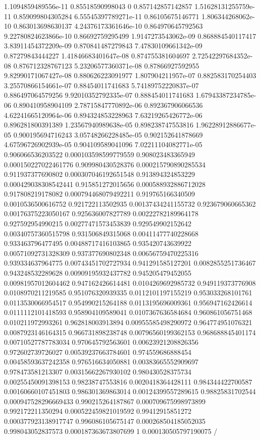 \begin{table}
\begin{tabu}
\begin{sparkline}{10}
1.1094859489556e-11 0.85518590998043 0 0.857142857142857 1.51628131255759e-11 0.859099804305284 6.55545397789271e-11 0.86105675146771 1.806344268062e-10 0.863013698630137 4.24376173361646e-10 0.864970645792563 9.22780824623866e-10 0.86692759295499 1.9147273543062e-09 0.868884540117417 3.83911454372209e-09 0.870841487279843 7.47830109661342e-09 0.87279843444227 1.41846683401647e-08 0.874755381604697 2.72542297684352e-08 0.876712328767123 5.23206577360371e-08 0.87866927592955 9.82990171067427e-08 0.880626223091977 1.807904211957e-07 0.882583170254403 3.25570866154661e-07 0.88454011741683 5.74189752220837e-07 0.886497064579256 9.92010352792335e-07 0.888454011741683 1.67943387234785e-06 0.890410958904109 2.78715847770892e-06 0.892367906066536 4.62241665120964e-06 0.894324853228963 7.63219265426772e-06 0.896281800391389 1.23567940989638e-05 0.898238747553816 1.96228912886677e-05 0.900195694716243 3.05748266228485e-05 0.902152641878669 4.67596726902939e-05 0.904109589041096 7.02211104082771e-05 0.906066536203522 0.000103598599779559 0.908023483365949 0.000150227022461776 0.909980430528376 0.000215790890285534 0.911937377690802 0.000307046192651548 0.913894324853229 0.000429038308542441 0.915851272015656 0.000588932886712028 0.917808219178082 0.000794468079492211 0.919765166340509 0.0010536500616752 0.921722113502935 0.00137434241155732 0.923679060665362 0.00176375223050167 0.925636007827789 0.00222782189964178 0.927592954990215 0.00277471573453839 0.929549902152642 0.00340757360515798 0.931506849315068 0.00411477740228668 0.933463796477495 0.00488717416103865 0.935420743639922 0.00571092731328309 0.937377690802348 0.00656759470225316 0.939334637964775 0.00743451702727934 0.941291585127201 0.0082855251736467 0.943248532289628 0.00909195932437782 0.945205479452055 0.00981957012604462 0.947162426614481 0.0104269692985732 0.949119373776908 0.0108970211219585 0.951076320939335 0.0112101197155219 0.953033268101761 0.0113530066954517 0.954990215264188 0.0113195696009361 0.956947162426614 0.0111112101418593 0.958904109589041 0.0107367636584684 0.960861056751468 0.010211972993261 0.962818003913894 0.00955585498290972 0.964774951076321 0.0087923146164315 0.966731898238748 0.00796560199362153 0.968688845401174 0.00710527787783034 0.970645792563601 0.00623921208826356 0.972602739726027 0.00539237663784601 0.974559686888454 0.00458593637242358 0.976516634050881 0.00383665552909697 0.978473581213307 0.00315662267930102 0.980430528375734 0.00255450091398153 0.98238747553816 0.0020418364428111 0.984344422700587 0.00160660107451803 0.986301369863014 0.00124399557289615 0.98825831702544 0.000947528296669433 0.990215264187867 0.000709675998973899 0.992172211350294 0.000522459821019592 0.99412915851272 0.000377923138917747 0.996086105675147 0.000268504185052035 0.998043052837573 0.000187363673807699 1 0.000130505797190075 /

\end{sparkline}
\end{tabu}
\end{table}
